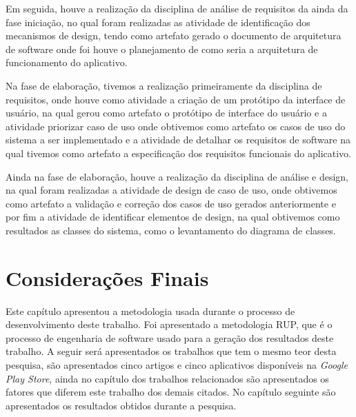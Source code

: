 Em seguida, houve a realização da disciplina de análise de requisitos da ainda da fase iniciação, no qual foram realizadas as atividade de identificação dos mecanismos de design, tendo como artefato gerado o documento de arquitetura de software onde foi houve o planejamento de como seria a arquitetura de funcionamento do aplicativo.

Na fase de elaboração, tivemos a realização primeiramente da disciplina de requisitos, onde houve como  atividade a criação de um protótipo da interface de usuário, na qual gerou como artefato o protótipo de interface do usuário e a atividade priorizar caso de uso onde obtivemos como artefato os casos de uso do sistema a ser implementado e a atividade de detalhar os requisitos de software na qual tivemos como artefato a especificação dos requisitos funcionais do aplicativo.

Ainda na fase de elaboração, houve a realização da disciplina de análise e design, na qual foram realizadas  a atividade de  design de caso de uso, onde obtivemos como artefato a validação e correção dos casos de uso gerados anteriormente e por fim a atividade de identificar elementos de design, na qual obtivemos como resultados as classes do sistema, como o levantamento do diagrama de classes.

\section{Considerações Finais}
Este capítulo apresentou a metodologia usada durante o processo de desenvolvimento deste trabalho. Foi apresentado a metodologia RUP, que é o processo de engenharia de software usado para a geração dos resultados deste trabalho. A seguir será apresentados os trabalhos que tem o mesmo teor desta pesquisa, são apresentados cinco artigos e cinco aplicativos disponíveis na \textit{Google Play Store}, ainda no capítulo dos trabalhos relacionados são apresentados os fatores que diferem este trabalho dos demais citados. No capítulo seguinte são apresentados os resultados obtidos durante a pesquisa.
